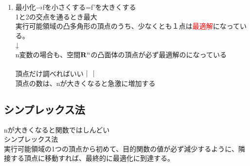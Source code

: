 \documentclass{jsarticle}
\begin{document}
{{\begin{enumerate}
\item 最小化→fを小さくする=f'を大きくする\\
	1と2の交点を通るとき最大\\
	実行可能領域の凸多角形の頂点のうち、少なくとも１点は\textcolor{red}{最適解}になっている。\\
	↓\\
	n変数の場合も、空間${\bf{R}}^n$の凸面体の頂点が必ず最適解のになっている\\
	\\
	頂点だけ調べればいい｜｜\\
	頂点の数は、nが大きくなると急激に増加する\\
\end{enumerate}
\subsection{シンプレックス法}
nが大きくなると関数ではしんどい\\
{\Large{シンプレックス法}}\\
実行可能領域の1つの頂点から初めて、目的関数の値が必ず減少するように、隣接する頂点に移動すれば、最終的に最適化に到達する。
}}
\end{document}
